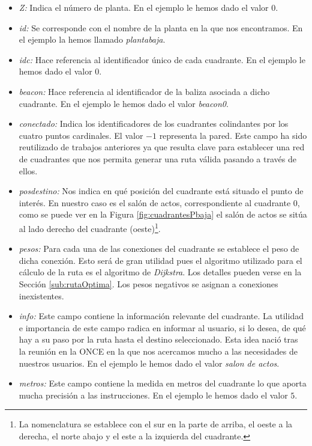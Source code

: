 \begin{itemize}
	\item \textit{Z:} Indica el número de planta. En el ejemplo le hemos dado el valor $0$.
	
	\item \textit{id:} Se corresponde con el nombre de la planta en la que nos encontramos. En el ejemplo la hemos llamado \textit{plantabaja}.
	
	\item \textit{idc:} Hace referencia al identificador único de cada cuadrante. En el ejemplo le hemos dado el valor $0$.
	
	\item \textit{beacon:} Hace referencia al identificador de la baliza asociada a dicho cuadrante. En el ejemplo le hemos dado el valor \textit{beacon0}.
	
	\item \textit{conectado:} Indica los identificadores de los cuadrantes colindantes por los cuatro puntos cardinales. El valor $-1$ representa la pared. Este campo ha sido reutilizado de trabajos anteriores ya que resulta clave para establecer una red de cuadrantes que nos permita generar una ruta válida pasando a través de ellos.
	
	\item \textit{posdestino:} Nos indica en qué posición del cuadrante está situado el punto de interés. En nuestro caso es el salón de actos, correspondiente al cuadrante $0$, como se puede ver en la Figura \ref{fig:cuadrantesPbaja} el salón de actos se sitúa al lado derecho del cuadrante (oeste)\footnote{La nomenclatura se establece con el sur en la parte de arriba, el oeste a la derecha, el norte abajo y el este a la izquierda del cuadrante.}.
	
	\item \textit{pesos:} Para cada una de las conexiones del cuadrante se establece el peso de dicha conexión. Esto será de gran utilidad pues el algoritmo utilizado para el cálculo de la ruta es el algoritmo de \textit{Dijkstra}. Los detalles pueden verse en la Sección \ref{sub:rutaOptima}. Los pesos negativos se asignan a conexiones inexistentes.
	
	\item \textit{info:} Este campo contiene la información relevante del cuadrante. La utilidad e importancia de este campo radica en informar al usuario, si lo desea, de qué hay a su paso por la ruta hasta el destino seleccionado. Esta idea nació tras la reunión en la ONCE en la que nos acercamos mucho a las necesidades de nuestros usuarios. En el ejemplo le hemos dado el valor \textit{salon de actos}.
	
	\item \textit{metros:} Este campo contiene la medida en metros del cuadrante lo que aporta mucha precisión a las instrucciones. En el ejemplo le hemos dado el valor $5$.
\end{itemize}





